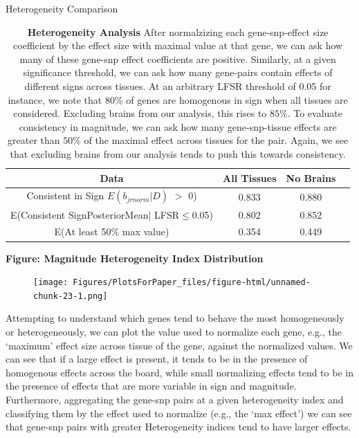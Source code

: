 \begin{table}[htbp]
\caption{Heterogeneity Comparison}
\centering
\begin{tabular}{c c c c}
\hline\hline
Data & All Tissues  & No Brains  \\ [0.5ex] %
\hline
Consistent in Sign $E(b_{jrnorm}|D)$ $>$ 0) &0.833&0.880 \\
E(Consistent SignPosteriorMean$\mid$ LFSR$\leq$0.05)&0.802&0.852\\
E(At least 50\% max value) &0.354&0.449\\
\hline
\end{tabular}
\label{table:nonlin}
\caption{\textbf{Heterogeneity Analysis} After normalzizing each gene-snp-effect size coefficient by the effect size with maximal value at that gene, we can ask how many of these gene-snp effect coefficients are positive. Similarly, at a given significance threshold, we can ask how many gene-pairs contain effects of different signs across tissues. At an arbitrary LFSR threshold of 0.05 for instance, we note that $80\%$ of genes are homogenous in sign when all tissues are considered. Excluding brains from our analysis, this rises to $85\%$. To evaluate consistency in magnitude, we can ask how many gene-snp-tissue effects are greater than $50\%$ of the maximal effect across tissues for the pair. Again, we see that excluding brains from our analysis tends to push this towards consistency.}
\end{table} \newline


\textbf{Figure: Magnitude Heterogeneity Index Distribution}
\newline
\begin{figure}[htbp]
\texttt{[image: Figures/PlotsForPaper\_files/figure-html/unnamed-chunk-23-1.png]}\\
\end{figure}\newline


Attempting to understand which genes tend to behave the most homogeneously or heterogeneously, we can plot the value used to normalize each gene, e.g., the `maximum' effect size across tissue of the gene, against the normalized values. We can see that if a large effect is present, it tends to be in the presence of homogenous effects across the board, while small normalizing effects tend to be in the presence of effects that are more variable in sign and magnitude. Furthermore, aggregating the gene-snp pairs at a given heterogeneity index and classifying them by the effect used to normalize (e.g., the `max effect') we can see that gene-snp pairs with greater Heterogeneity indices tend to have larger effects. \newline


